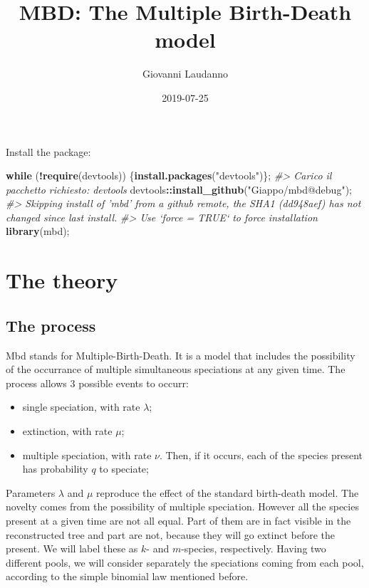 \documentclass[]{article}
\title{MBD: The Multiple Birth-Death model}
\author{Giovanni Laudanno}
\date{2019-07-25}
\newenvironment{Shaded}{\begin{snugshade}}{\end{snugshade}}
\newcommand{\CommentTok}[1]{\textcolor[rgb]{0.56,0.35,0.01}{\textit{#1}}}
\newcommand{\ControlFlowTok}[1]{\textcolor[rgb]{0.13,0.29,0.53}{\textbf{#1}}}
\newcommand{\KeywordTok}[1]{\textcolor[rgb]{0.13,0.29,0.53}{\textbf{#1}}}
\newcommand{\NormalTok}[1]{#1}
\newcommand{\OperatorTok}[1]{\textcolor[rgb]{0.81,0.36,0.00}{\textbf{#1}}}
\newcommand{\StringTok}[1]{\textcolor[rgb]{0.31,0.60,0.02}{#1}}
\providecommand{\tightlist}{%
  \setlength{\itemsep}{0pt}\setlength{\parskip}{0pt}}
\begin{document}
\maketitle

{
\setcounter{tocdepth}{2}
\tableofcontents
}
Install the package:

\begin{Shaded}
\begin{Highlighting}[]
\ControlFlowTok{while}\NormalTok{ (}\OperatorTok{!}\KeywordTok{require}\NormalTok{(devtools)) \{}\KeywordTok{install.packages}\NormalTok{(}\StringTok{"devtools"}\NormalTok{)\};}
\CommentTok{#> Carico il pacchetto richiesto: devtools}
\NormalTok{devtools}\OperatorTok{::}\KeywordTok{install_github}\NormalTok{(}\StringTok{"Giappo/mbd@debug"}\NormalTok{);}
\CommentTok{#> Skipping install of 'mbd' from a github remote, the SHA1 (dd948aef) has not changed since last install.}
\CommentTok{#>   Use `force = TRUE` to force installation}
\KeywordTok{library}\NormalTok{(mbd);}
\end{Highlighting}
\end{Shaded}

\hypertarget{the-theory}{%
\section{The theory}\label{the-theory}}

\hypertarget{the-process}{%
\subsection{The process}\label{the-process}}

Mbd stands for Multiple-Birth-Death. It is a model that includes the possibility
of the occurrance of multiple simultaneous speciations at any given time.
The process allows 3 possible events to occurr:

\begin{itemize}
\tightlist
\item
  single speciation, with rate \(\lambda\);
\item
  extinction, with rate \(\mu\);
\item
  multiple speciation, with rate \(\nu\). Then, if it occurs, each of the species present has probability \(q\) to speciate;
\end{itemize}

Parameters \(\lambda\) and \(\mu\) reproduce the effect of the standard birth-death
model. The novelty comes from the possibility of multiple speciation.
However all the species present at a given time are not all equal. Part of them
are in fact visible in the reconstructed tree and part are not, because they will go extinct before the
present. We will label these as \(k\)- and \(m\)-species, respectively.
Having two different pools, we will consider separately the speciations coming
from each pool, according to the simple binomial law mentioned before.
\end{document}

